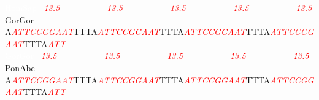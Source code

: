 \documentclass[11pt,twoside,reqno,a4paper]{article}
\begin{document}
{\textcolor{white}{HomSap	}\ \textit{\textcolor{red}{13.5}}\ \ \ \ \ \ \ \ \ \ \ \textit{\textcolor{red}{13.5}}\ \ \ \ \ \ \ \ \ \ \ \textit{\textcolor{red}{13.5}}\ \ \ \ \ \ \ \ \ \ \ \textit{\textcolor{red}{13.5}}\ \ \ \ \ \ \ \ \ \ \ \textit{\textcolor{red}{13.5}}\\
GorGor	A\textit{\textcolor{red}{A}}\textit{\textcolor{red}{T}}\textit{\textcolor{red}{T}}\textit{\textcolor{red}{C}}\textit{\textcolor{red}{C}}\textit{\textcolor{red}{G}}\textit{\textcolor{red}{G}}\textit{\textcolor{red}{A}}\textit{\textcolor{red}{A}}\textit{\textcolor{red}{T}}TTTA\textit{\textcolor{red}{A}}\textit{\textcolor{red}{T}}\textit{\textcolor{red}{T}}\textit{\textcolor{red}{C}}\textit{\textcolor{red}{C}}\textit{\textcolor{red}{G}}\textit{\textcolor{red}{G}}\textit{\textcolor{red}{A}}\textit{\textcolor{red}{A}}\textit{\textcolor{red}{T}}TTTA\textit{\textcolor{red}{A}}\textit{\textcolor{red}{T}}\textit{\textcolor{red}{T}}\textit{\textcolor{red}{C}}\textit{\textcolor{red}{C}}\textit{\textcolor{red}{G}}\textit{\textcolor{red}{G}}\textit{\textcolor{red}{A}}\textit{\textcolor{red}{A}}\textit{\textcolor{red}{T}}TTTA\textit{\textcolor{red}{A}}\textit{\textcolor{red}{T}}\textit{\textcolor{red}{T}}\textit{\textcolor{red}{C}}\textit{\textcolor{red}{C}}\textit{\textcolor{red}{G}}\textit{\textcolor{red}{G}}\textit{\textcolor{red}{A}}\textit{\textcolor{red}{A}}\textit{\textcolor{red}{T}}TTTA\textit{\textcolor{red}{A}}\textit{\textcolor{red}{T}}\textit{\textcolor{red}{T}}\\
\textcolor{white}{GorGor	}\ \textit{\textcolor{red}{13.5}}\ \ \ \ \ \ \ \ \ \ \ \textit{\textcolor{red}{13.5}}\ \ \ \ \ \ \ \ \ \ \ \textit{\textcolor{red}{13.5}}\ \ \ \ \ \ \ \ \ \ \ \textit{\textcolor{red}{13.5}}\ \ \ \ \ \ \ \ \ \ \ \textit{\textcolor{red}{13.5}}\\
PonAbe	A\textit{\textcolor{red}{A}}\textit{\textcolor{red}{T}}\textit{\textcolor{red}{T}}\textit{\textcolor{red}{C}}\textit{\textcolor{red}{C}}\textit{\textcolor{red}{G}}\textit{\textcolor{red}{G}}\textit{\textcolor{red}{A}}\textit{\textcolor{red}{A}}\textit{\textcolor{red}{T}}TTTA\textit{\textcolor{red}{A}}\textit{\textcolor{red}{T}}\textit{\textcolor{red}{T}}\textit{\textcolor{red}{C}}\textit{\textcolor{red}{C}}\textit{\textcolor{red}{G}}\textit{\textcolor{red}{G}}\textit{\textcolor{red}{A}}\textit{\textcolor{red}{A}}\textit{\textcolor{red}{T}}TTTA\textit{\textcolor{red}{A}}\textit{\textcolor{red}{T}}\textit{\textcolor{red}{T}}\textit{\textcolor{red}{C}}\textit{\textcolor{red}{C}}\textit{\textcolor{red}{G}}\textit{\textcolor{red}{G}}\textit{\textcolor{red}{A}}\textit{\textcolor{red}{A}}\textit{\textcolor{red}{T}}TTTA\textit{\textcolor{red}{A}}\textit{\textcolor{red}{T}}\textit{\textcolor{red}{T}}\textit{\textcolor{red}{C}}\textit{\textcolor{red}{C}}\textit{\textcolor{red}{G}}\textit{\textcolor{red}{G}}\textit{\textcolor{red}{A}}\textit{\textcolor{red}{A}}\textit{\textcolor{red}{T}}TTTA\textit{\textcolor{red}{A}}\textit{\textcolor{red}{T}}\textit{\textcolor{red}{T}}\\
}
\end{document}
